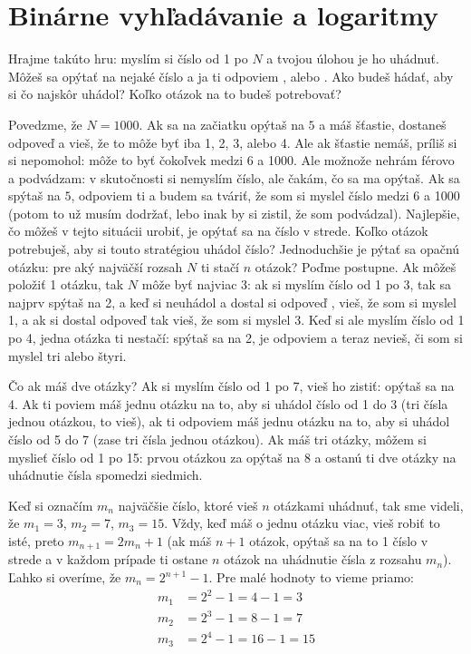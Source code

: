 \chapter{Binárne vyhľadávanie a logaritmy}
\label{sect:binarysearch}

Hrajme takúto hru: myslím si číslo od 1 po $N$ a tvojou úlohou je ho uhádnuť. Môžeš
sa opýtať na nejaké číslo a ja ti odpoviem ,  alebo .
Ako budeš hádať, aby si čo najskôr uhádol? Koľko otázok na to budeš potrebovať?

 
Povedzme, že $N=1000$. Ak sa na začiatku opýtaš na $5$ a máš šťastie, dostaneš odpoveď
 a vieš, že to môže byť iba 1, 2, 3, alebo 4. Ale ak šťastie nemáš,
príliš si si nepomohol: môže to byť čokoľvek medzi 6 a 1000. Ale možnože nehrám férovo a
podvádzam: v skutočnosti si nemyslím číslo, ale čakám, čo sa ma opýtaš. Ak sa spýtaš na $5$,
odpoviem ti  a budem sa tváriť, že som si myslel číslo medzi 6 a 1000 (potom 
to už musím dodržať, lebo inak by si zistil, že som podvádzal). Najlepšie, čo môžeš 
v tejto situácii urobiť,
je opýtať sa na číslo v strede. Koľko otázok potrebuješ, aby si touto stratégiou 
uhádol číslo? Jednoduchšie je pýtať sa opačnú otázku: pre aký najväčší rozsah $N$
ti stačí $n$ otázok? Poďme postupne. Ak môžeš položiť 1 otázku, tak $N$ môže byť najviac 
$3$: ak si myslím číslo od 1 po 3, tak sa najprv spýtaš na 2, a keď si neuhádol a dostal
si odpoveď , vieš, že som si myslel 1, a ak si dostal odpoveď  tak vieš,
že som si myslel 3. Keď si ale myslím číslo od 1 po 4, jedna otázka ti nestačí: spýtaš sa
na 2, je odpoviem  a teraz nevieš, či som si myslel tri alebo štyri.


Čo ak máš dve otázky? Ak si myslím číslo od 1 po 7, vieš ho zistiť: opýtaš sa na 4. Ak ti
poviem  máš jednu otázku na to, aby si uhádol číslo od 1 do 3 (tri čísla jednou
otázkou, to vieš), ak ti
odpoviem  máš jednu otázku na to, aby si uhádol číslo od 5 do 7 (zase tri čísla
jednou otázkou). Ak máš tri otázky, môžem si myslieť číslo od 1 po 15: prvou otázkou
za opýtaš na 8 a ostanú ti dve otázky na uhádnutie čísla spomedzi siedmich.


Keď si označím $m_n$ najväčšie číslo, ktoré vieš $n$ otázkami uhádnuť, tak sme videli,
že $m_1=3$, $m_2=7$, $m_3=15$. Vždy, keď máš o jednu otázku viac, vieš robiť to isté,
preto $m_{n+1}=2m_n+1$ (ak máš $n+1$ otázok, opýtaš sa na to 1 číslo v strede a 
v každom prípade ti ostane $n$ otázok na uhádnutie čísla z rozsahu  $m_n$). Ľahko si overíme,
že $m_n=2^{n+1}-1$. Pre malé hodnoty to vieme priamo:
\begin{align*}
  m_1&=2^2-1=4-1=3 \\
  m_2&=2^3-1=8-1=7 \\
  m_3&=2^4-1=16-1=15
\end{align*}

